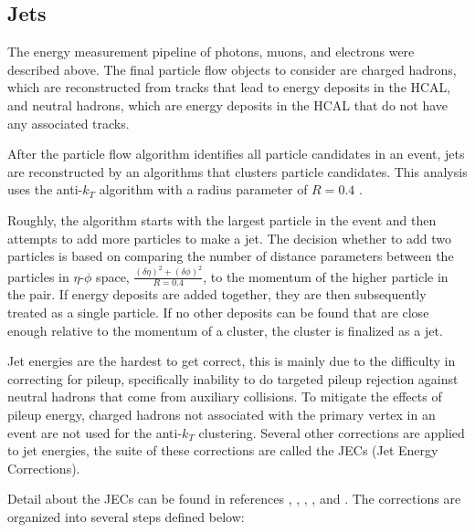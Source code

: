   \FloatBarrier

  \subsection{Jets} \label{sec:jets}
    The energy measurement pipeline of photons, muons, and electrons were described above. The final particle flow objects to consider are charged hadrons, which are reconstructed from tracks that lead to energy deposits in the HCAL, and neutral hadrons, which are energy deposits in the HCAL that do not have any associated tracks.

    After the particle flow algorithm identifies all particle candidates in an event, jets are reconstructed by an algorithms that clusters particle candidates. This analysis uses the anti-$k_T$ algorithm with a radius parameter of $R=0.4$\cite{anti_kt} \cite{jet_reco_algos}. 

    Roughly, the algorithm starts with the largest \pt particle in the event and then attempts to add more particles to make a jet. The decision whether to add two particles is based on comparing the number of distance parameters between the particles in $\eta$-$\phi$ space, $\frac{(\delta \eta)^2 + (\delta \phi)^2}{R=0.4}$, to the momentum of the higher \pt particle in the pair. If energy deposits are added together, they are then subsequently treated as a single particle. If no other deposits can be found that are close enough relative to the momentum of a cluster, the cluster is finalized as a jet.

    Jet energies are the hardest to get correct, this is mainly due to the difficulty in correcting for pileup, specifically inability to do targeted pileup rejection against neutral hadrons that come from auxiliary collisions. To mitigate the effects of pileup energy, charged hadrons not associated with the primary vertex in an event are not used for the anti-$k_T$ clustering. Several other corrections are applied to jet energies, the suite of these corrections are called the JECs (Jet Energy Corrections). 

    Detail about the JECs can be found in references \cite{JEC_2016}, \cite{jetmet_2011}, \cite{JERC}, \cite{jec_summary}, and \cite{intro_jec}. The corrections are organized into several steps defined below:

